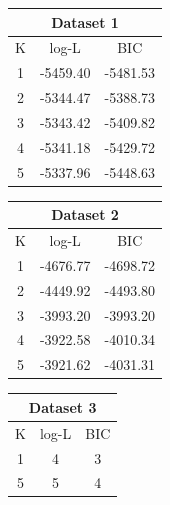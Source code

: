 \documentclass[11pt,psfig]{article}
\begin{document}
\begin{table}[H]
  \centering
  \begin{tabular}{|c|c|c|}
    \hline
    \multicolumn{3}{|c|}{Dataset 1} \\\hline
    K & log-L & BIC \\\hline
    1 & -5459.40 & -5481.53 \\
		2 & -5344.47 & -5388.73 \\
		3 & -5343.42 & -5409.82 \\
		4 & -5341.18 & -5429.72 \\
    5 & -5337.96 & -5448.63 \\\hline
  \end{tabular}
  \begin{tabular}{|c|c|c|}
    \hline
    \multicolumn{3}{|c|}{Dataset 2} \\\hline
    K & log-L & BIC \\\hline
    1 & -4676.77 & -4698.72 \\
		2 & -4449.92 & -4493.80 \\
		3 & -3993.20 & -3993.20 \\
		4 & -3922.58 & -4010.34 \\
    5 & -3921.62 & -4031.31 \\\hline
  \end{tabular}
  \begin{tabular}{|c|c|c|}
    \hline
    \multicolumn{3}{|c|}{Dataset 3} \\\hline
    K & log-L & BIC \\\hline
    1 & 4 & 3 \\
    5 & 5 & 4 \\\hline
  \end{tabular}
\end{table}
\end{document}

